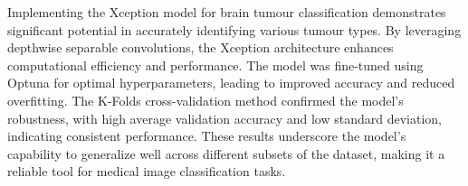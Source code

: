 Implementing the Xception model for brain tumour classification demonstrates significant potential in accurately identifying various tumour types. By leveraging depthwise separable convolutions, the Xception architecture enhances computational efficiency and performance. The model was fine-tuned using Optuna for optimal hyperparameters, leading to improved accuracy and reduced overfitting. The K-Folds cross-validation method confirmed the model's robustness, with high average validation accuracy and low standard deviation, indicating consistent performance. These results underscore the model's capability to generalize well across different subsets of the dataset, making it a reliable tool for medical image classification tasks.



